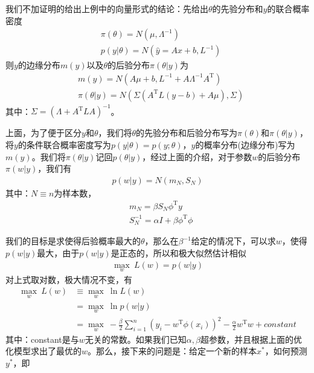         \par
        我们不加证明的给出上例中的向量形式的结论：先给出$\theta$的先验分布和$y$的联合概率密度
        \begin{align*}
        &\pi(\theta) = N(\mu,\varLambda^{-1}) \\
        &p(y|\theta) = N(\hat{y} = Ax+b,L^{-1})
        \end{align*}
        则$y$的边缘分布$m(y)$以及$\theta$的后验分布$\pi(\theta|y)$为
        \begin{align*}
        &m(y) = N(A\mu+b,L^{-1}+A\varLambda^{-1}A^{\mathrm{T}})\\
        &\pi(\theta|y) = N(\Sigma(A^\mathrm{T}L(y-b)+A\mu),\Sigma)
        \end{align*}
        其中：$\Sigma = (\varLambda +A^\mathrm{T} L A)^{-1}$。
        \par
        上面，为了便于区分$y$和$\theta$，我们将$\theta$的先验分布和后验分布写为$\pi(\theta)$和$\pi(\theta|y)$，将$y$的条件联合概率密度写为$p(y|\theta) = p(y;\theta)$，$y$的概率分布(边缘分布)写为$m(y)$。我们将$\pi(\theta|y)$记回$p(\theta|y)$，经过上面的介绍，对于参数$w$的后验分布$\pi(w|y)$，我们有
        \begin{align*}
        p(w|y)  = N(m_N,S_N)
        \end{align*}
        其中：$N \equiv n$为样本数，
        \begin{align*}
        &m_N = \beta S_N\phi ^\mathrm{T}y\\
        &S_N^{-1} = \alpha I+ \beta \phi^\mathrm{T}\phi
        \end{align*}
        \par
        我们的目标是求使得后验概率最大的$\theta$，那么在$\beta^{-1}$给定的情况下，可以求$w$，使得$p(w|y)$最大，由于$p(w|y)$是正态的，所以和极大似然估计相似
        \begin{align*}
        \max_w \ L(w) = p(w|y)
        \end{align*}
        对上式取对数，极大情况不变，有
        \begin{align*}
        \max_w \ L(w) &\equiv \max_w \ \ln L(w) \\
        &=\max_w \ \ln p(w|y) \\
        &=\max_w \ -\frac{\beta}{2}\sum_{i=1}^n \left( y_i - w^\mathrm{T}\phi(x_i) \right) ^2 - \frac{\alpha}{2}w^\mathrm{T}w + constant
        \end{align*}
        其中：constant是与$w$无关的常数。如果我们已知$\alpha,\beta$超参数，并且根据上面的优化模型求出了最优的$w$。那么，接下来的问题是：给定一个新的样本$x^*$，如何预测$y^*$，即
